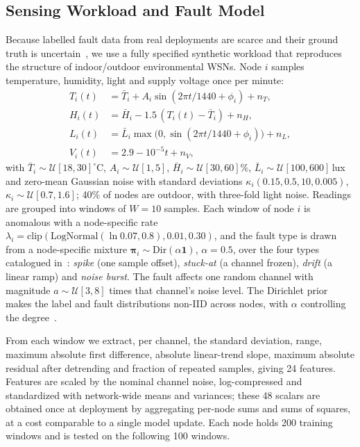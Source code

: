 \documentclass[journal]{IEEEtran}
\begin{document}
\subsection{Sensing Workload and Fault Model}
Because labelled fault data from real deployments are scarce and their ground truth is uncertain~\cite{sharma2010}, we use a fully specified synthetic workload that reproduces the structure of indoor/outdoor environmental WSNs. Node $i$ samples temperature, humidity, light and supply voltage once per minute:
\begin{align}
T_i(t)&=\bar T_i+A_i\sin(2\pi t/1440+\phi_i)+n_T,\nonumber\\
H_i(t)&=\bar H_i-1.5\,(T_i(t)-\bar T_i)+n_H,\\
L_i(t)&=\bar L_i\max\!\big(0,\sin(2\pi t/1440+\phi_i)\big)+n_L,\nonumber\\
V_i(t)&=2.9-10^{-5}t+n_V,\nonumber
\end{align}
with $\bar T_i\sim\mathcal{U}[18,30]^\circ$C, $A_i\sim\mathcal{U}[1,5]$, $\bar H_i\sim\mathcal{U}[30,60]\%$, $\bar L_i\sim\mathcal{U}[100,600]$\,lux and zero-mean Gaussian noise with standard deviations $\kappa_i(0.15,0.5,10,0.005)$, $\kappa_i\sim\mathcal{U}[0.7,1.6]$; 40\% of nodes are outdoor, with three-fold light noise. Readings are grouped into windows of $W=10$ samples. Each window of node $i$ is anomalous with a node-specific rate $\lambda_i=\mathrm{clip}(\mathrm{LogNormal}(\ln 0.07,0.8),0.01,0.30)$, and the fault type is drawn from a node-specific mixture $\boldsymbol\pi_i\sim\mathrm{Dir}(\alpha\mathbf{1})$, $\alpha=0.5$, over the four types catalogued in~\cite{ni2009,sharma2010}: \emph{spike} (one sample offset), \emph{stuck-at} (a channel frozen), \emph{drift} (a linear ramp) and \emph{noise burst}. The fault affects one random channel with magnitude $a\sim\mathcal{U}[3,8]$ times that channel's noise level. The Dirichlet prior makes the label and fault distributions non-IID across nodes, with $\alpha$ controlling the degree~\cite{hsu2019}.

From each window we extract, per channel, the standard deviation, range, maximum absolute first difference, absolute linear-trend slope, maximum absolute residual after detrending and fraction of repeated samples, giving 24 features. Features are scaled by the nominal channel noise, log-compressed and standardized with network-wide means and variances; these 48 scalars are obtained once at deployment by aggregating per-node sums and sums of squares, at a cost comparable to a single model update. Each node holds 200 training windows and is tested on the following 100 windows.
\end{document}
